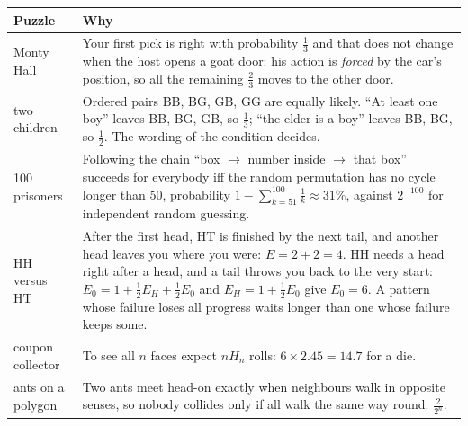 \documentclass[10pt,a4paper,openany,oneside]{report}
\begin{document}
\begin{center}\small
\begin{xltabular}{\textwidth}{@{}L{3.0cm}Y@{}}
\toprule
\textbf{Puzzle} & \textbf{Why}\\
\midrule\endhead
Monty Hall & Your first pick is right with probability $\frac13$ and that does not change when the host opens a goat door: his action is \emph{forced} by the car's position, so all the remaining $\frac23$ moves to the other door.\\
two children & Ordered pairs BB, BG, GB, GG are equally likely. ``At least one boy'' leaves BB, BG, GB, so $\frac13$; ``the elder is a boy'' leaves BB, BG, so $\frac12$. The wording of the condition decides.\\
100 prisoners & Following the chain ``box $\to$ number inside $\to$ that box'' succeeds for everybody iff the random permutation has no cycle longer than 50, probability $1-\sum_{k=51}^{100}\frac1k\approx31\%$, against $2^{-100}$ for independent random guessing.\\
HH versus HT & After the first head, HT is finished by the next tail, and another head leaves you where you were: $E=2+2=4$. HH needs a head right after a head, and a tail throws you back to the very start: $E_0=1+\frac12E_H+\frac12E_0$ and $E_H=1+\frac12E_0$ give $E_0=6$. A pattern whose failure loses all progress waits longer than one whose failure keeps some.\\
coupon collector & To see all $n$ faces expect $nH_n$ rolls: $6\times2.45=14.7$ for a die.\\
ants on a polygon & Two ants meet head-on exactly when neighbours walk in opposite senses, so nobody collides only if all walk the same way round: $\frac2{2^n}$.\\
\bottomrule
\end{xltabular}
\end{center}
\end{document}
